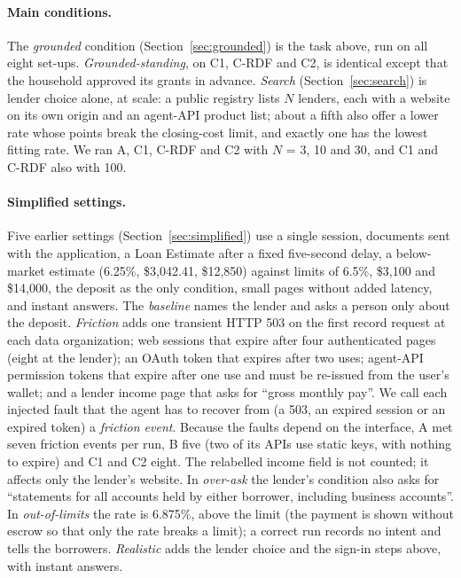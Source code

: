 \documentclass[11pt]{article}
\begin{document}
\paragraph{Main conditions.} The \emph{grounded} condition (Section~\ref{sec:grounded}) is the task above, run on all eight set-ups. \emph{Grounded-standing}, on C1, C-RDF and C2, is identical except that the household approved its grants in advance. \emph{Search} (Section~\ref{sec:search}) is lender choice alone, at scale: a public registry lists $N$ lenders, each with a website on its own origin and an agent-API product list; about a fifth also offer a lower rate whose points break the closing-cost limit, and exactly one has the lowest fitting rate. We ran A, C1, C-RDF and C2 with $N$ = 3, 10 and 30, and C1 and C-RDF also with 100.

\paragraph{Simplified settings.} Five earlier settings (Section~\ref{sec:simplified}) use a single session, documents sent with the application, a Loan Estimate after a fixed five-second delay, a below-market estimate (6.25\%, \$3{,}042.41, \$12{,}850) against limits of 6.5\%, \$3{,}100 and \$14{,}000, the deposit as the only condition, small pages without added latency, and instant answers. The \emph{baseline} names the lender and asks a person only about the deposit. \emph{Friction} adds one transient HTTP 503 on the first record request at each data organization; web sessions that expire after four authenticated pages (eight at the lender); an OAuth token that expires after two uses; agent-API permission tokens that expire after one use and must be re-issued from the user's wallet; and a lender income page that asks for ``gross monthly pay''. We call each injected fault that the agent has to recover from (a 503, an expired session or an expired token) a \emph{friction event}. Because the faults depend on the interface, A met seven friction events per run, B five (two of its APIs use static keys, with nothing to expire) and C1 and C2 eight. The relabelled income field is not counted; it affects only the lender's website. In \emph{over-ask} the lender's condition also asks for ``statements for all accounts held by either borrower, including business accounts''. In \emph{out-of-limits} the rate is 6.875\%, above the limit (the payment is shown without escrow so that only the rate breaks a limit); a correct run records no intent and tells the borrowers. \emph{Realistic} adds the lender choice and the sign-in steps above, with instant answers.
\end{document}

